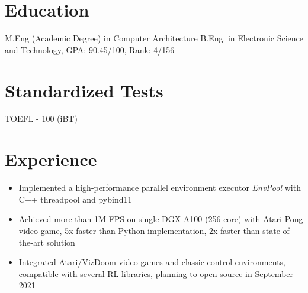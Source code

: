 \documentclass{resume}
\begin{document}



\section{Education}
M.Eng (Academic Degree) in Computer Architecture
B.Eng. in Electronic Science and Technology, GPA: 90.45/100, Rank: 4/156

\section{Standardized Tests}
TOEFL - 100 (iBT)

\section{Experience}
\begin{itemize}
\item Implemented a high-performance parallel environment executor \textit{EnvPool} with C++ threadpool and pybind11
\item Achieved more than 1M FPS on single DGX-A100 (256 core) with Atari Pong video game, 5x faster than Python implementation, 2x faster than state-of-the-art solution
\item Integrated Atari/VizDoom video games and classic control environments, compatible with several RL libraries, planning to open-source in September 2021
\end{itemize}

\end{document}
